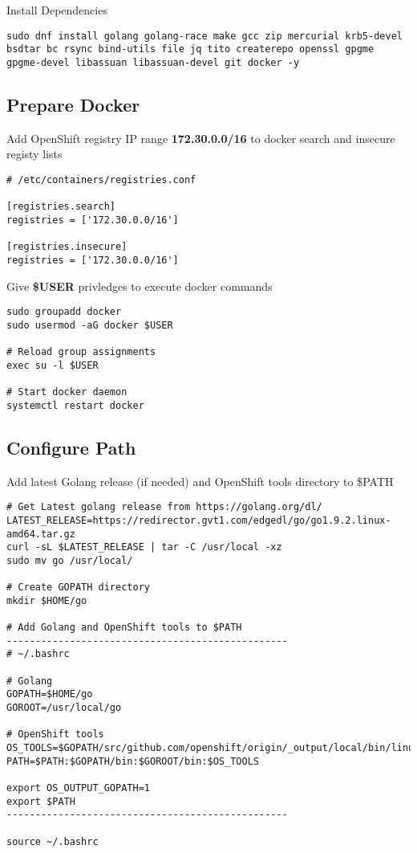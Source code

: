 \documentclass{article}
\begin{document}
Install Dependencies
\begin{lstlisting}
sudo dnf install golang golang-race make gcc zip mercurial krb5-devel bsdtar bc rsync bind-utils file jq tito createrepo openssl gpgme gpgme-devel libassuan libassuan-devel git docker -y
\end{lstlisting}

\subsection{Prepare Docker}

Add OpenShift registry IP range \textbf{172.30.0.0/16} to docker search and insecure registy lists
\begin{lstlisting}
# /etc/containers/registries.conf

[registries.search]
registries = ['172.30.0.0/16']

[registries.insecure]
registries = ['172.30.0.0/16']
\end{lstlisting}

Give \textbf{\$USER} privledges to execute docker commands

\begin{lstlisting}
sudo groupadd docker
sudo usermod -aG docker $USER

# Reload group assignments
exec su -l $USER

# Start docker daemon
systemctl restart docker
\end{lstlisting}

\subsection{Configure Path}

Add latest Golang release (if needed) and OpenShift tools directory to \$PATH

\begin{lstlisting}
# Get Latest golang release from https://golang.org/dl/
LATEST_RELEASE=https://redirector.gvt1.com/edgedl/go/go1.9.2.linux-amd64.tar.gz
curl -sL $LATEST_RELEASE | tar -C /usr/local -xz
sudo mv go /usr/local/

# Create GOPATH directory
mkdir $HOME/go

# Add Golang and OpenShift tools to $PATH
-------------------------------------------------
# ~/.bashrc

# Golang
GOPATH=$HOME/go
GOROOT=/usr/local/go

# OpenShift tools
OS_TOOLS=$GOPATH/src/github.com/openshift/origin/_output/local/bin/linux/amd64/
PATH=$PATH:$GOPATH/bin:$GOROOT/bin:$OS_TOOLS

export OS_OUTPUT_GOPATH=1
export $PATH
-------------------------------------------------

source ~/.bashrc
\end{lstlisting}
\end{document}
